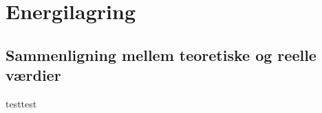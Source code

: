 \documentclass[../main.tex]{subfiles}
\begin{document}
\chapter{Energilagring } \label{Chap:Energilagring}

\section{Sammenligning mellem teoretiske og reelle værdier}
testtest
\end{document}
